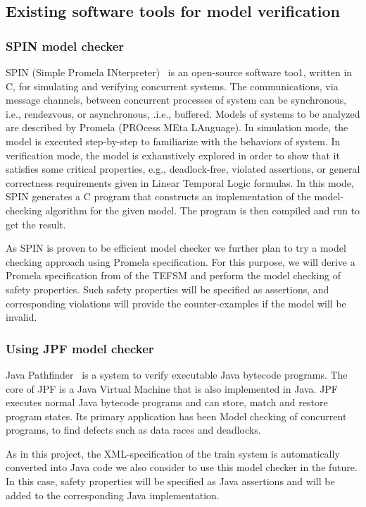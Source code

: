 \documentclass{template/openetcs_article}
\begin{document}
\subsection{Existing software tools for model verification}\label{sec4}

\subsubsection{SPIN model checker}

SPIN (Simple Promela INterpreter)~\cite{Holzmann97} is an open-source software too1, written in C, for simulating and verifying concurrent systems. The communications, via message channels, between concurrent processes of system can be synchronous, i.e., rendezvous, or asynchronous, .i.e., buffered. Models of systems to be analyzed are described by Promela (PROcess MEta LAnguage). In simulation mode, the model is executed step-by-step to familiarize with the behaviors of system. In verification mode, the model is exhaustively explored in order to show that it satisfies some critical properties, e.g., deadlock-free, violated assertions, or general correctness requirements given in Linear Temporal Logic formulas. In this mode, SPIN generates a C program that constructs an implementation of the model-checking algorithm for the given model. The program is then compiled and run to get the result.

As SPIN is proven to be efficient model checker we further plan to try a model checking approach using Promela specification. For this purpose, we will derive a Promela specification from of the TEFSM and perform the model checking of safety properties. Such safety properties will be specified as assertions, and corresponding violations will provide the counter-examples if the model will be invalid.

\subsubsection{Using JPF model checker}

Java Pathfinder~\cite{JPF} is a system to verify executable Java bytecode programs. The core of JPF is a Java Virtual Machine that is also implemented in Java. JPF executes normal Java bytecode programs and can store, match and restore program states. Its primary application has been Model checking of concurrent programs, to find defects such as data races and deadlocks. 

As in this project, the XML-specification of the train system is automatically converted into Java code we also consider to use this model checker in the future. In this case, safety properties will be specified as Java assertions and will be added to the corresponding Java implementation. 
\end{document}
